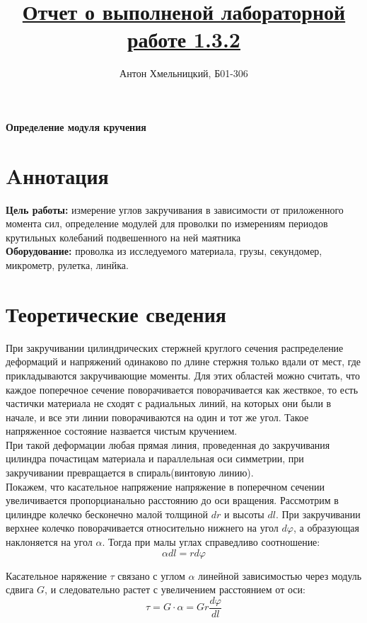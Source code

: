 \documentclass[a4paper]{article}
\title{\underline{Отчет о выполненой лабораторной работе 1.3.2}}
\author{Антон Хмельницкий, Б01-306}
\begin{document}
\maketitle
\begin{center}
\Large{\textbf{Определение модуля кручения}}
\end{center}
\section{Aннотация}
\textbf{Цель работы: }измерение углов закручивания в зависимости от приложенного момента
сил, определение модулей для проволки по измерениям периодов крутильных колебаний подвешенного на
ней маятника\\
\textbf{Оборудование: }проволка из исследуемого материала,
грузы, секундомер, микрометр, рулетка, линйка.
\section{Теоретические сведения}
При закручивании цилиндрических стержней круглого сечения распределение деформаций
 и напряжений одинаково по длине стержня только вдали от мест, где прикладываются закручивающие моменты.
Для этих областей можно считать, что каждое поперечное сечение поворачивается поворачивается как жествкое,
то есть частички материала не сходят с радиальных линий, на которых они были в начале, и все
эти линии поворачиваются на один и тот же угол. Такое напряженное состояние назвается чистым кручением.\\

При такой деформации любая прямая линия, проведенная до закручивания цилиндра почастицам материала и параллельная оси симметрии,
при закручивании превращается в спираль(винтовую линию). \\

Покажем, что касательное напряжение напряжение в поперечном сечении увеличивается пропорцианально
 расстоянию до оси вращения.
Рассмотрим в цилиндре колечко бесконечно малой толщиной $dr$ и высоты $dl$. При закручивании верхнее колечко поворачивается относительно 
нижнего на угол $d\varphi$, а образующая наклоняется на угол $\alpha$. Тогда при малы углах справедливо соотношение:
\begin{equation}
    \alpha dl= r d\varphi 
\end{equation}

Касательное наряжение $\tau $ связано с углом $\alpha$ линейной зависимостью через модуль сдвига $G$,
 и следовательно растет с увеличением расстоянием от оси:
\begin{equation}
    \tau = G\cdot \alpha =Gr\frac{d\varphi}{dl} 
\end{equation}
\end{document}
